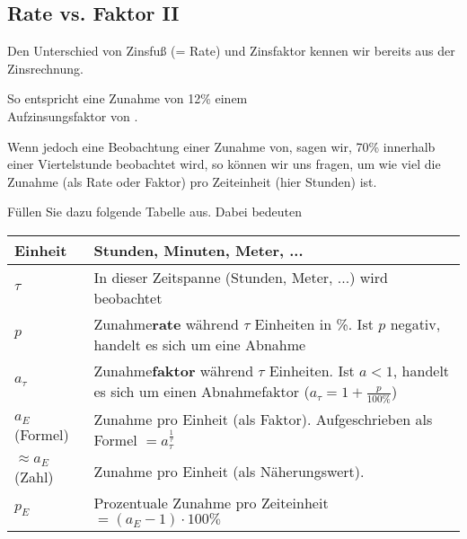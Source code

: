 \subsection{Rate vs. Faktor
  II}

Den Unterschied von Zinsfuß (= Rate) und Zinsfaktor kennen wir bereits aus der Zinsrechnung.

So entspricht eine Zunahme von 12\% einem\\
Aufzinsungsfaktor von .

Wenn jedoch eine Beobachtung einer Zunahme von, sagen wir, 70\% innerhalb einer Viertelstunde beobachtet wird, so können wir uns fragen, um wie viel die Zunahme (als Rate oder Faktor) pro Zeiteinheit (hier Stunden) ist.


Füllen Sie dazu folgende Tabelle aus. Dabei bedeuten

\begin{tabular}{lp{14cm}}\hline
  Einheit & Stunden, Minuten, Meter, ... \\\hline
  $\tau$  & In dieser Zeitspanne (Stunden, Meter, ...) wird beobachtet \\\hline
  $p$     & Zunahme\textbf{rate}\index{Zunahmerate}\index{Rate} während $\tau$ Einheiten in \%. Ist $p$ negativ, handelt es sich um eine Abnahme\\\hline
  $a_\tau$ & Zunahme\textbf{faktor}\index{Zunahmefaktor} während
  $\tau$ Einheiten. Ist $a<1$, handelt es sich um einen Abnahmefaktor
  ($a_{\tau} = 1+\frac{p}{100\%}$)\\\hline
  $a_E$ (Formel)   & Zunahme pro Einheit (als Faktor). Aufgeschrieben
  als Formel $=a_{\tau}^{\frac1{\tau}}$\\\hline
  $\approx a_E$ (Zahl)  & Zunahme pro Einheit (als Näherungswert).\\\hline
  $p_E$   & Prozentuale Zunahme pro Zeiteinheit $=(a_E-1)\cdot{}100\%$\\\hline
  \end{tabular} 

\leserluft{}
\leserluft{}
\newcommand{\ph}[1]{\noTRAINER{...........}\TRAINER{#1}}

